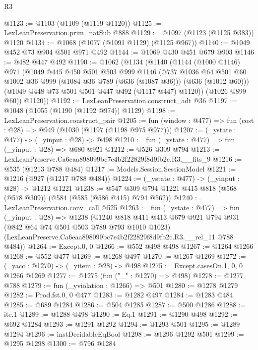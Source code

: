 \begin{lexlean}{R3}
\begin{coremodule}
@1123 := @1103 (@1109 (@1119 @1120))
@1125 := LexLeanPreservation.prim_natSub @888
@1129 := @1097 (@1123 (@1125 @383)) @1120
@1134 := @1068 (@1077 (@1091 @1129) (@1125 @967))
@1140 := @1049 @452 @73 @904 @501 @971 @492
@1144 := @1069 @430 @451 @679 @903
@1146 := @482 @447 @492
@1190 := @1062
    (@1134
      (@1140
        (@1144
          (@1000 @1146)
          @971
          (@1049
            @445
            @450
            @501
            @503
            @999
            @1146
            (@737
              @1036
              @64
              @501
              @60
              @1002
              @36
              @999
              (@1084 @36 @789 (@636 (@1087 @36)))
              (@636 (@1012 @60)))
            (@1049 @448 @73 @501 @501 @447 @492 (@1117 @447) @1120))
          (@1026 @899 @60))
        @1120))
@1192 := LexLeanPreservation.construct_adt @36
@1197 := @1048 (@1055 (@1190 (@1192 @974)) @1129)
@1198 := LexLeanPreservation.construct_pair
@1205 := fun (window : @477) => fun (cost : @28) => @949 (@1030 (@1197 (@1198 @975 @977)))
@1207 := (_ystate : @477) -> (_yinput : @28) -> @498
@1210 := fun (_ystate : @477) => fun (_yinput : @28) => @680 @921
@1212 := @526 @309 @794
@1213 := LexLeanPreserve.Ca6eaa898099bc7e4b2f22829f8d9fb2c.R3.__fits_9
@1216 := @535 (@1213 @788 @484)
@1217 := Models.Session.SessionModel
@1221 := @1216 (@927 (@1217 @788 @484))
@1224 := (_ystate : @477) -> (_yinput : @28) -> @1212 @1221
@1238 := @547 @309 @794 @1221 @415 @818 (@568 (@578 @309)) (@584 (@585 (@586 @415) @794 @562))
@1240 := LexLeanPreservation.conv_call @525
@1263 := fun (_ystate : @477) =>
  fun (_yinput : @28) =>
  @1238
    (@1240
      @818
      @411
      @413
      @679
      @921
      @794
      @931
      (@842 @64 @74 @501 @503 @789 @793 @1010 @1023)
      (LexLeanPreserve.Ca6eaa898099bc7e4b2f22829f8d9fb2c.R3.__rel_11 @788 @484))
@1264 := Except.{0, 0}
@1266 := @552 @498 @498
@1267 := @1264 @1266
@1268 := @552 @477
@1269 := @1268 @497
@1270 := @1267 @1269
@1272 := (_yacc : @1270) -> (_yitem : @28) -> @498
@1275 := Except.casesOn.{1, 0, 0} @1266 @1269
@1277 := @1275 (fun ("_" : @1270) => @498)
@1278 := @1277 @788
@1279 := fun (_yviolation : @1266) => @501
@1280 := @1278 @1279
@1282 := Prod.fst.{0, 0} @477
@1283 := @1282 @497
@1284 := @1283 @484
@1285 := @689 @1284
@1286 := @504 @1285
@1287 := @500 @1286
@1288 := ite.{1}
@1289 := @1288 @498
@1290 := Eq.{1}
@1291 := @1290 @498
@1292 := @692 @1284
@1293 := @1291 @1292
@1294 := @1293 @501
@1295 := @1289 @1294
@1296 := instDecidableEqBool
@1298 := @1296 @1292 @501
@1299 := @1295 @1298
@1300 := @796 @1284

\end{coremodule}
\end{lexlean}
